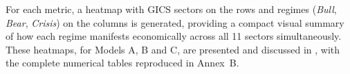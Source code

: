 For each metric, a heatmap with GICS sectors on the rows and regimes
(\emph{Bull}, \emph{Bear}, \emph{Crisis}) on the columns is generated,
providing a compact visual summary of how each regime manifests
economically across all 11 sectors simultaneously. These heatmaps, for
Models A, B and C, are presented and discussed in , with
the complete numerical tables reproduced in Annex~B.
